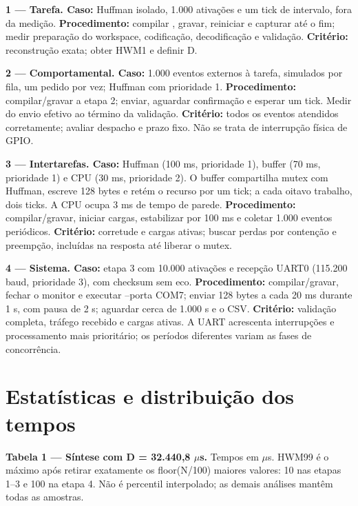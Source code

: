 \textbf{1 --- Tarefa. Caso:} Huffman isolado, 1.000 ativações e um tick de intervalo, fora da medição. \textbf{Procedimento:} compilar , gravar, reiniciar e capturar até o fim; medir preparação do workspace, codificação, decodificação e validação. \textbf{Critério:} reconstrução exata; obter HWM1 e definir D.
\par

\textbf{2 --- Comportamental. Caso:} 1.000 eventos externos à tarefa, simulados por fila, um pedido por vez; Huffman com prioridade 1. \textbf{Procedimento:} compilar/gravar a etapa 2; enviar, aguardar confirmação e esperar um tick. Medir do envio efetivo ao término da validação. \textbf{Critério:} todos os eventos atendidos corretamente; avaliar despacho e prazo fixo. Não se trata de interrupção física de GPIO.
\par

\textbf{3 --- Intertarefas. Caso:} Huffman (100 ms, prioridade 1), buffer (70 ms, prioridade 1) e CPU (30 ms, prioridade 2). O buffer compartilha mutex com Huffman, escreve 128 bytes e retém o recurso por um tick; a cada oitavo trabalho, dois ticks. A CPU ocupa 3 ms de tempo de parede. \textbf{Procedimento:} compilar/gravar, iniciar cargas, estabilizar por 100 ms e coletar 1.000 eventos periódicos. \textbf{Critério:} corretude e cargas ativas; buscar perdas por contenção e preempção, incluídas na resposta até liberar o mutex.
\par

\textbf{4 --- Sistema. Caso:} etapa 3 com 10.000 ativações e recepção UART0 (115.200 baud, prioridade 3), com checksum sem eco. \textbf{Procedimento:} compilar/gravar, fechar o monitor e executar  --porta COM7; enviar 128 bytes a cada 20 ms durante 1 s, com pausa de 2 s; aguardar cerca de 1.000 s e o CSV. \textbf{Critério:} validação completa, tráfego recebido e cargas ativas. A UART acrescenta interrupções e processamento mais prioritário; os períodos diferentes variam as fases de concorrência.
\par

\clearpage

\section{Estatísticas e distribuição dos tempos}

\textbf{Tabela 1 --- Síntese com D = 32.440,8 \ensuremath{\mu}s.} Tempos em \ensuremath{\mu}s. HWM99 é o máximo após retirar exatamente os floor(N/100) maiores valores: 10 nas etapas 1--3 e 100 na etapa 4. Não é percentil interpolado; as demais análises mantêm todas as amostras.
\par

